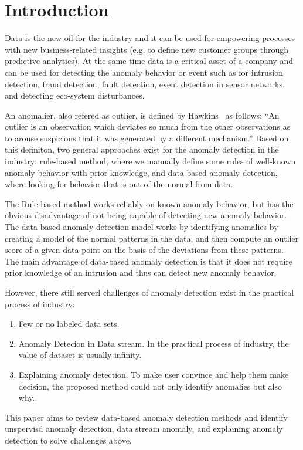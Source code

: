 \section{Introduction}\label{sec-intro}

Data is the new oil for the industry and
it can be used for empowering processes with
new business-related insights
(e.g. to define new customer groups through predictive analytics).
At the same time data is a critical asset of a company and
can be used for detecting the anomaly behavior or event
such as for
intrusion detection,
fraud detection,
fault detection,
event detection in sensor networks,
and detecting eco-system disturbances.

An anomalier,
also refered as outlier, 
is defined by Hawkins~\cite{hawkins1980identification}
as follows:
``An outlier is an observation which
deviates so much from the other observations
as to arouse suspicions that
it was generated by a different mechanism.''
Based on this definiton,
two general approaches exist for the anomaly
detection in the industry:
rule-based method,
where we manually define some rules of
well-known anomaly behavior
with prior knowledge,
and data-based anomaly detection,
where looking for behavior that
is out of the normal from data.

The Rule-based method works reliably on known anomaly behavior,
but has the obvious disadvantage of not being capable of
detecting new anomaly behavior.
The data-based anomaly detection model works by
identifying anomalies by creating a model of
the normal patterns in the data,
and then compute an outlier score of a given data point
on the basis of the deviations from these patterns.
The main advantage of data-based anomaly detection is that
it does not require prior knowledge of an intrusion and
thus can detect new anomaly behavior.


However,
there still serverl challenges of anomaly detection exist
in the practical  process of industry:
\begin{enumerate}
    \item Few or no labeled data sets.
    \item Anomaly Detecion in Data stream.
    In the practical process of industry,
    the value of dataset is usually infinity.
    \item Explaining anomaly detection.
    To make  user convince and help them make decision,
    the proposed method could not only identify anomalies  but also
    why.
\end{enumerate}
This paper aims to review data-based anomaly detection methods and
identify unspervisd anomaly detection,
data stream anomaly, and explaining anomaly detection
to solve challenges above.

